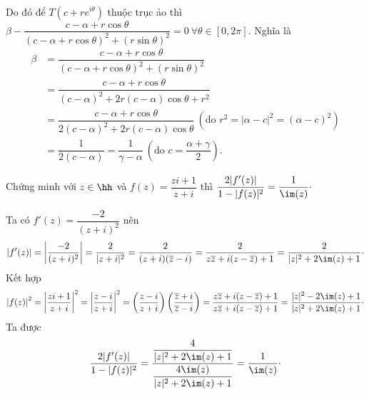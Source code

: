 \begin{sol*}
\begin{itemize}
\begin{align*}
    \end{align*}
    Do đó để $T(c+re^{i\theta})$ thuộc trục ảo thì $\beta - \dfrac{c-\alpha+r\cos{\theta}}{(c-\alpha+r\cos{\theta})^2 + (r\sin{\theta})^2} = 0~\forall \theta \in [0,2\pi]$. Nghĩa là 
    \begin{align*}
        \beta & = \dfrac{c-\alpha+r\cos{\theta}}{(c-\alpha+r\cos{\theta})^2 + (r\sin{\theta})^2}\\
        &= \dfrac{c-\alpha+r\cos{\theta}}{(c-\alpha)^2+2r(c-\alpha)\cos{\theta} + r^2}\\
        &= \dfrac{c-\alpha+r\cos{\theta}}{2(c-\alpha)^2+2r(c-\alpha)\cos{\theta}}~(\text{do } r^2 = |\alpha-c|^2 = (\alpha-c)^2)\\
        &= \dfrac{1}{2(c-\alpha)} = \dfrac{1}{\gamma -\alpha}~\left(\text{do }c =\dfrac{\alpha + \gamma}{2} \right).
    \end{align*}
\end{itemize}
\end{sol*}
\begin{ex}
    Chứng minh với $z \in \hh$ và $f(z) = \dfrac{zi+1}{z+i}$ thì $\dfrac{2|f'(z)|}{1-|f(z)|^2}=\dfrac{1}{\im(z)}\cdot$
\end{ex}
\begin{sol*}
Ta có $f'(z) = \dfrac{-2}{(z+i)^2}$ nên 
\[|f'(z)| = \left|\dfrac{-2}{(z+i)^2}\right| = \dfrac{2}{|z+i|^2} = \dfrac{2}{(z+i)(\overline{z}-i)}=\dfrac{2}{z\overline{z}+i(z-\overline{z})+1}=\dfrac{2}{|z|^2+2\im(z)+1}\cdot\] Kết hợp 
\[
    \left|f(z)\right|^2 = \left|\dfrac{zi+1}{z+i}\right|^2 
    = \left|\dfrac{z-i}{z+i}\right|^2 
    = \left(\dfrac{z-i}{z+i}\right)\left(\dfrac{\overline{z}+i}{\overline{z}-i}\right)
    =\dfrac{z\overline{z}+i(z-\overline{z})+1}{z\overline{z}+i(z-\overline{z})+1} = \dfrac{|z|^2-2\im(z)+1}{|z|^2+2\im(z)+1}\cdot
\]
Ta được 
\[
    \dfrac{2|f'(z)|}{1-|f(z)|^2} = \dfrac{\dfrac{4}{|z|^2+2\im(z)+1}}{\dfrac{4\im(z)}{|z|^2+2\im(z)+1}}=\dfrac{1}{\im(z)}\cdot
\]
\end{sol*}